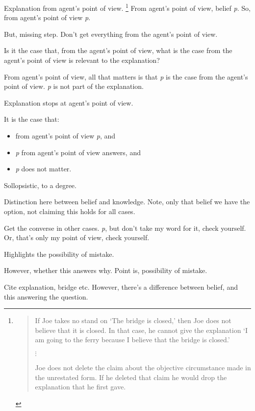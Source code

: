 \begin{note}[Distinction]
  Explanation from agent's point of view.%
  \footnote{
    \begin{quote}
      If Joe takes no stand on ‘The bridge is closed,’ then Joe does not believe that it is closed. In that case, he cannot give the explanation ‘I am going to the ferry because I believe that the bridge is closed.’

      \mbox{}\hfill\(\vdots\)\hfill\mbox{}

      Joe does not delete the claim about the objective circumstance made in the unrestated form.
      If he deleted that claim he would drop the explanation that he first gave.
      \cite[113--114]{Collins:1997wn}
    \end{quote}

  }
  From agent's point of view, belief \emph{p}.
  So, from agent's point of view \emph{p}.

  But, missing step.
  Don't get everything from the agent's point of view.

  Is it the case that, from the agent's point of view, what is the case from the agent's point of view is relevant to the explanation?

  From agent's point of view, all that matters is that \emph{p} is the case from the agent's point of view.
  \emph{p} is not part of the explanation.

  Explanation stops at agent's point of view.

  It is the case that:
  \begin{itemize}
  \item
    from agent's point of view \emph{p}, and
  \item
    \emph{p} from agent's point of view answers, and
  \item
    \emph{p} does not matter.
  \end{itemize}

  Sollopsistic, to a degree.

  Distinction here between belief and knowledge.
  Note, only that belief we have the option, not claiming this holds for all cases.

  Get the converse in other cases.
  \emph{p}, but don't take my word for it, check yourself.
  Or, that's only my point of view, check yourself.

  Highlights the possibility of mistake.


  However, whether this answers why.
  Point is, possibility of mistake.

  
  Cite explanation, bridge etc.
  However, there's a difference between belief, and this answering the question.


\end{note}
